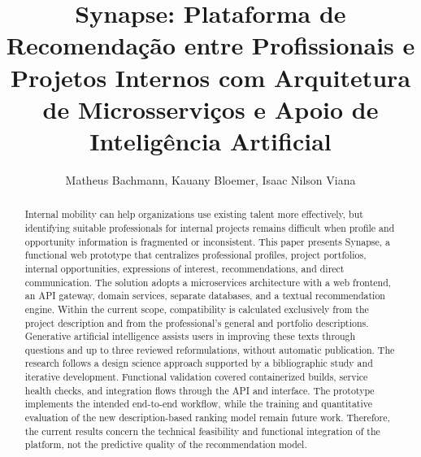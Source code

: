 \documentclass[12pt]{article}
\title{Synapse: Plataforma de Recomendação entre Profissionais e Projetos Internos com Arquitetura de Microsserviços e Apoio de Inteligência Artificial}
\author{Matheus Bachmann\inst{1}, Kauany Bloemer\inst{1}, Isaac Nilson Viana\inst{1}}
\begin{document}
\maketitle

\begin{abstract}
  Internal mobility can help organizations use existing talent more effectively, but identifying suitable professionals for internal projects remains difficult when profile and opportunity information is fragmented or inconsistent. This paper presents Synapse, a functional web prototype that centralizes professional profiles, project portfolios, internal opportunities, expressions of interest, recommendations, and direct communication. The solution adopts a microservices architecture with a web frontend, an API gateway, domain services, separate databases, and a textual recommendation engine. Within the current scope, compatibility is calculated exclusively from the project description and from the professional's general and portfolio descriptions. Generative artificial intelligence assists users in improving these texts through questions and up to three reviewed reformulations, without automatic publication. The research follows a design science approach supported by a bibliographic study and iterative development. Functional validation covered containerized builds, service health checks, and integration flows through the API and interface. The prototype implements the intended end-to-end workflow, while the training and quantitative evaluation of the new description-based ranking model remain future work. Therefore, the current results concern the technical feasibility and functional integration of the platform, not the predictive quality of the recommendation model.
\end{abstract}
\end{document}
